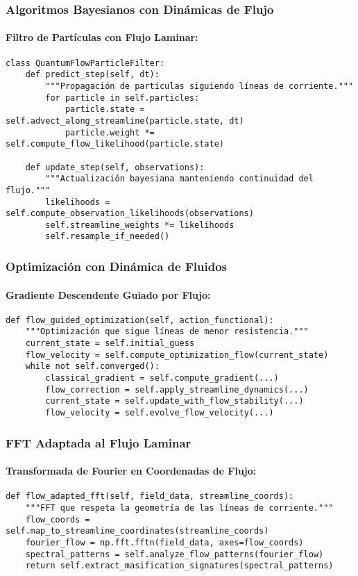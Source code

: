\documentclass{book}
\begin{document}
\subsubsection{Algoritmos Bayesianos con Dinámicas de Flujo}
\paragraph{Filtro de Partículas con Flujo Laminar:}
\begin{verbatim}
class QuantumFlowParticleFilter:
    def predict_step(self, dt):
        """Propagación de partículas siguiendo líneas de corriente."""
        for particle in self.particles:
            particle.state = self.advect_along_streamline(particle.state, dt)
            particle.weight *= self.compute_flow_likelihood(particle.state)

    def update_step(self, observations):
        """Actualización bayesiana manteniendo continuidad del flujo."""
        likelihoods = self.compute_observation_likelihoods(observations)
        self.streamline_weights *= likelihoods
        self.resample_if_needed()
\end{verbatim}

\subsubsection{Optimización con Dinámica de Fluidos}
\paragraph{Gradiente Descendente Guiado por Flujo:}
\begin{verbatim}
def flow_guided_optimization(self, action_functional):
    """Optimización que sigue líneas de menor resistencia."""
    current_state = self.initial_guess
    flow_velocity = self.compute_optimization_flow(current_state)
    while not self.converged():
        classical_gradient = self.compute_gradient(...)
        flow_correction = self.apply_streamline_dynamics(...)
        current_state = self.update_with_flow_stability(...)
        flow_velocity = self.evolve_flow_velocity(...)
\end{verbatim}

\subsubsection{FFT Adaptada al Flujo Laminar}
\paragraph{Transformada de Fourier en Coordenadas de Flujo:}
\begin{verbatim}
def flow_adapted_fft(self, field_data, streamline_coords):
    """FFT que respeta la geometría de las líneas de corriente."""
    flow_coords = self.map_to_streamline_coordinates(streamline_coords)
    fourier_flow = np.fft.fftn(field_data, axes=flow_coords)
    spectral_patterns = self.analyze_flow_patterns(fourier_flow)
    return self.extract_masification_signatures(spectral_patterns)
\end{verbatim}
\end{document}

